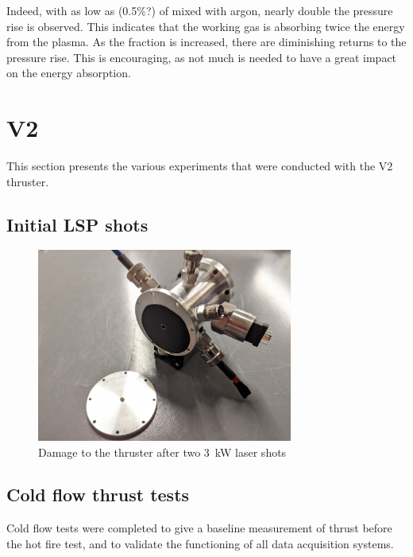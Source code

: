             Indeed, with as low as (0.5\%?) of  mixed with argon, nearly double the pressure rise is observed. This indicates that the working gas is absorbing twice the energy from the plasma. As the  fraction is increased, there are diminishing returns to the pressure rise. This is encouraging, as not much  is needed to have a great impact on the energy absorption.

    \section{V2}
        This section presents the various experiments that were conducted with the V2 thruster.
    
        \subsection{Initial LSP shots}

            \begin{figure}
                \centering
                \includegraphics[width=0.75\textwidth]{assets/5 results/V2 test damage.jpg}
                \caption{Damage to the thruster after two \qty{3}{kW} laser shots}
            \end{figure}

        
        \subsection{Cold flow thrust tests}

            Cold flow tests were completed to give a baseline measurement of thrust before the hot fire test, and to validate the functioning of all data acquisition systems.
            
